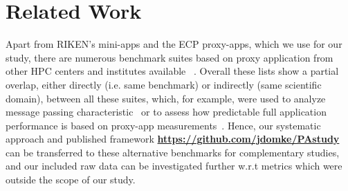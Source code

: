 \section{Related Work}\label{sec:relwork}
%
Apart from RIKEN's mini-apps and the ECP proxy-apps, which we use for our study, there are numerous benchmark suites
based on proxy application from other HPC centers and institutes available
~\cite{prace_unified_2016,noauthor_mantevo_nodate,nersc_characterization_nodate,llnl_llnl_nodate,llnl_coral_nodate,spec_spec_nodate}.
Overall these lists show a partial overlap, either directly (i.e. same benchmark) or indirectly (same
scientific domain), between all these suites, which, for example, were used to analyze message passing characteristic~\cite{klenk_overview_2017} or to assess how predictable full application performance is
based on proxy-app measurements~\cite{barrett_assessing_2015}.
Hence, our systematic approach and published framework \textbf{\url{https://github.com/jdomke/PAstudy}} can be
transferred to these alternative benchmarks for complementary studies, and our included raw data
can be investigated further w.r.t metrics which were outside the scope of our study.









